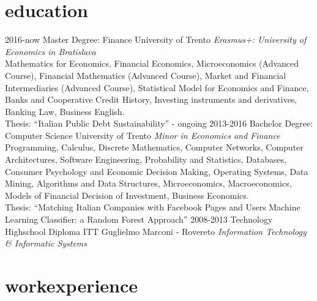 \documentclass[]{friggeri-cv}
\begin{document}
\section{education}

\begin{entrylist}

\entry
    {2016-now}
    {Master Degree: Finance}
    {University of Trento}
    {\emph{Erasmus+: University of Economics in Bratislava}\\
    Mathematics for Economics, Financial Economics, Microeconomics (Advanced Course), Financial Mathematics (Advanced Course),
    Market and Financial Intermediaries (Advanced Course), Statistical Model for Economics and Finance,
    Banks and Cooperative Credit History, Investing instruments and derivatives, Banking Law, Business English.\\
    Thesis: “Italian Public Debt Sustainability” - ongoing
    }
\entry
    {2013-2016}
    {Bachelor Degree: Computer Science}
    {University of Trento}
    {\emph{Minor in Economics and Finance}\\
    Programming, Calculus, Discrete Mathematics, Computer Networks, Computer Architectures, Software Engineering,
    Probability and Statistics, Databases, Consumer Psychology and Economic Decision Making, Operating Systems,
    Data Mining, Algorithms and Data Structures, Microeconomics, Macroeconomics, Models of Financial Decision of Investment,
    Business Economics.\\
    Thesis: “Matching Italian Companies with Facebook Pages and Users Machine Learning Classifier: a Random Forest Approach”
    }
\entry
    {2008-2013}
    {Technology Highschool Diploma}
    {ITT Guglielmo Marconi - Rovereto}
    {\emph{Information Technology \& Informatic Systems}}

\end{entrylist}

\section{workexperience}
\end{document}
